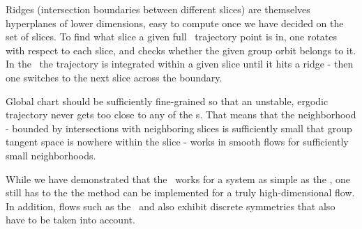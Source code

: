 Ridges (intersection boundaries between different slices) are themselves
hyperplanes of lower dimensions, easy to compute once we have decided
on the set of slices. To find what slice a given full \statesp\
trajectory point is in, one rotates with respect to each slice, and
checks whether the given group orbit belongs to it. In the \reducedsp\
the trajectory is integrated within a given slice until it hits a ridge -
then one switches to the next slice across the boundary.

Global chart should be sufficiently fine-grained so that an unstable,
ergodic trajectory never gets too close to any of the {\sset s}. That
means that the neighborhood - bounded by intersections with neighboring
slices is sufficiently small that group tangent space is nowhere within
the slice - works in smooth flows for sufficiently small neighborhoods.

While we have demonstrated that the
\mslices\ works for a system as simple as the \cLf,
one still has to the the method can be implemented for a
truly high-dimensional flow. In addition, flows such as the
\KS\ and {\pCf} also exhibit discrete symmetries that also have to be taken into account.

